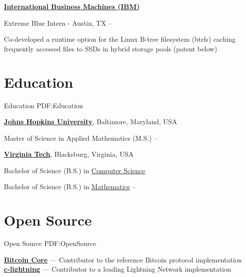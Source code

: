 \documentclass[a4paper,10pt,oneside]{article}
\begin{document}
\begin{body}
\EntryGap

\href{https://www.ibm.com}
{\textbf{International Business Machines (IBM)}}
\par
Extreme Blue Intern - Austin, TX
\hfill
{} --
\begin{detail}
\BulletItem Co-developed a runtime option for the Linux B-tree filesystem (btrfs) caching frequently accessed files to SSDs in hybrid storage pools (patent below)
\end{detail}


\section
{Education}
{Education}
{PDF:Education}

\href{https://www.jhu.edu/}
{\textbf{Johns Hopkins University}},
Baltimore, Maryland, USA

\SmallEntryGap
Master of Science in Applied Mathematics (M.S.)
\hfill
{} --

\EntryGap
\href{https://www.vt.edu/}
{\textbf{Virginia Tech}},
Blacksburg, Virginia, USA
\par
Bachelor of Science (B.S.) in
\href{https://www.cs.vt.edu/}
{Computer Science}
\par
Bachelor of Science (B.S.) in
\href{https://www.math.vt.edu/}
{Mathematics}
\hfill
{} --


\section
{Open Source}
{Open Source}
{PDF:OpenSource}
\begin{detail}
\BulletItem \href{https://github.com/bitcoin/bitcoin}{\textbf{Bitcoin Core}} --- Contributor to the reference Bitcoin protocol implementation
\BulletItem \href{https://github.com/ElementsProject/lightning}{\textbf{c-lightning}} --- Contributor to a leading Lightning Network implementation
\end{detail}



\end{body}
\end{document}
